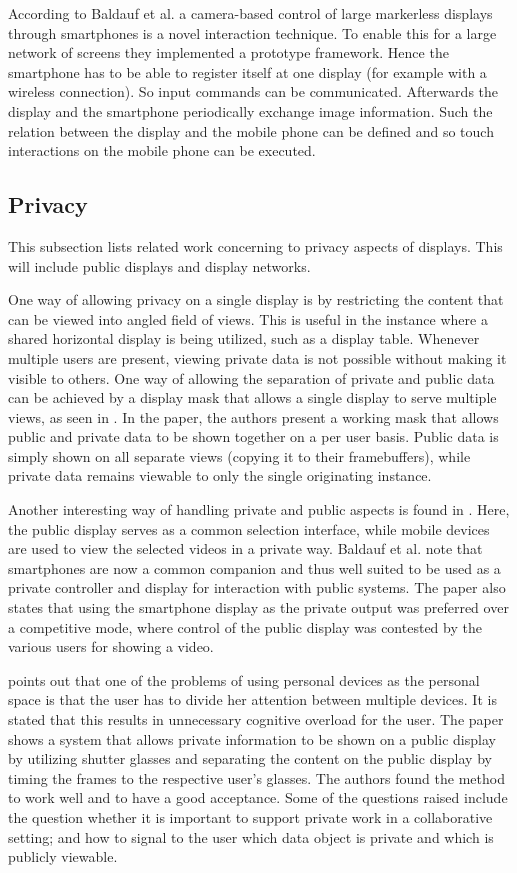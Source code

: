 According to Baldauf et al. \cite{a4-baldauf} a camera-based control of large markerless displays through smartphones is a novel interaction technique.
To enable this for a large network of screens they implemented a prototype framework.
Hence the smartphone has to be able to register itself at one display (for example with a wireless connection).
So input commands can be communicated.
Afterwards the display and the smartphone periodically exchange image information.
Such the relation between the display and the mobile phone can be defined and so touch interactions on the mobile phone can be executed.


\subsection{Privacy}

This subsection lists related work concerning to privacy aspects of displays.
This will include public displays and display networks.

One way of allowing privacy on a single display is by restricting the content that can be viewed into angled field of views.
This is useful in the instance where a shared horizontal display is being utilized, such as a display table.
Whenever multiple users are present, viewing private data is not possible without making it visible to others.
One way of allowing the separation of private and public data can be achieved by a display mask that allows a single display to serve multiple views, as seen in \cite{smith2008public}.
In the paper, the authors present a working mask that allows public and private data to be shown together on a per user basis.
Public data is simply shown on all separate views (copying it to their framebuffers), while private data remains viewable to only the single originating instance.

Another interesting way of handling private and public aspects is found in \cite{baldauf2012private}.
Here, the public display serves as a common selection interface, while mobile devices are used to view the selected videos in a private way.
Baldauf et al. note that smartphones are now a common companion and thus well suited to be used as a private controller and display for interaction with public systems.
The paper also states that using the smartphone display as the private output was preferred over a competitive mode, where control of the public display was contested by the various users for showing a video.

\cite{shoemaker2001single} points out that one of the problems of using personal devices as the personal space is that the user has to divide her attention between multiple devices.
It is stated that this results in unnecessary cognitive overload for the user.
The paper shows a system that allows private information to be shown on a public display by utilizing shutter glasses and separating the content on the public display by timing the frames to the respective user's glasses.
The authors found the method to work well and to have a good acceptance.
Some of the questions raised include the question whether it is important to support private work in a collaborative setting; and how to signal to the user which data object is private and which is publicly viewable.

